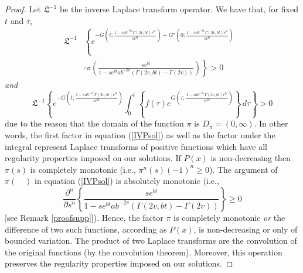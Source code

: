 \documentclass[preprint, 12pt]{elsarticle}
\numberwithin{equation}{section}
\theoremstyle{plain}
\theoremstyle{remark}
\newcommand{\nocomma}{}
\begin{document}
\begin{proof}
Let $\mathfrak{L}^{-1}$ be the inverse Laplace transform operator. We have that, for fixed $t$ and $\tau$,
\begin{eqnarray*} 
\mathfrak{L}^{- 1} & \left\{e^{- G \left( t ; \frac{1 - s a b^{- 2 v} \Gamma (2 v \nocomma, b t) e^{b t}}{s e^{bt}} \right) + G^{\star} \left( 0 ; \frac{1 - s a b^{- 2 v} \Gamma (2 v \nocomma, bt)e^{bt}}{s e^{bt}} \right)} \right. & \\
& \left. \cdot \pi \left(\frac{s e^{bt}}{1 - s e^{bt} a b^{- 2 v}  (\Gamma (2 v \nocomma, b t) - \Gamma (2 v \nocomma))} \right) \right\} > 0 &
\end{eqnarray*}
\emph{and}
\[ \mathfrak{L}^{- 1} \left\{ e^{- G \left( t ; \frac{1 - s a b^{- 2 v} \Gamma (2 v \nocomma, b t) e^{b t}}{s e^{bt}} \right)} \int_0^t \left\{ f (\tau) e^{G \left( \tau ; \frac{1 - s a b^{- 2 v} \Gamma (2 v \nocomma, b t) e^{b t}}{s e^{bt}} \right)} \right\}\, d \tau \right\} > 0 \]
due to the reason that the domain of the function $\pi$ is $D_{\pi} = (0, \infty)$. In other words, the first factor in equation (\ref{IVPsol}) as well as the factor under the integral represent Laplace transforms of positive functions which have all regularity properties imposed on our solutions. If $P (x)$ is non-decreasing then $\pi (s)$ is completely monotonic (i.e., $\displaystyle{\pi^n (s)  (- 1)^n \geqslant 0}$). The argument of $\pi \left( \hspace{1em} \right)$ in equation (\ref{IVPsol}) is absolutely monotonic (i.e., 
\[\displaystyle{\frac{\partial^n}{\partial s^n} \left\{ \frac{s e^{bt}}{1 - s e^{bt} a b^{- 2 v}  (\Gamma (2 v \nocomma, b t) - \Gamma (2 v \nocomma))} \right\} \geqslant 0}\] 
[see Remark \ref{proofsupp}]). Hence, the factor $\pi$ is completely monotonic \emph{or} the difference of two such functions, according as $P (x)$, is non-decreasing or only of bounded variation. The product of two Laplace transforms are the convolution of the original functions (by the convolution theorem). Moreover, this operation preserves the regularity properties imposed on our solutions.
\end{proof}
\end{document}
